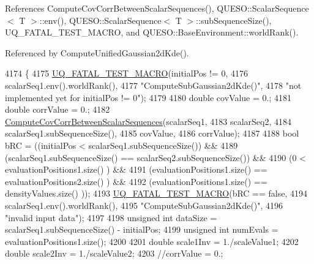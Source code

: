 References Compute\-Cov\-Corr\-Between\-Scalar\-Sequences(), Q\-U\-E\-S\-O\-::\-Scalar\-Sequence$<$ T $>$\-::env(), Q\-U\-E\-S\-O\-::\-Scalar\-Sequence$<$ T $>$\-::sub\-Sequence\-Size(), U\-Q\-\_\-\-F\-A\-T\-A\-L\-\_\-\-T\-E\-S\-T\-\_\-\-M\-A\-C\-R\-O, and Q\-U\-E\-S\-O\-::\-Base\-Environment\-::world\-Rank().



Referenced by Compute\-Unified\-Gaussian2d\-Kde().


\begin{DoxyCode}
4174 \{
4175   \hyperlink{_defines_8h_a56d63d18d0a6d45757de47fcc06f574d}{UQ\_FATAL\_TEST\_MACRO}(initialPos != 0,
4176                       scalarSeq1.env().worldRank(),
4177                       \textcolor{stringliteral}{"ComputeSubGaussian2dKde()"},
4178                       \textcolor{stringliteral}{"not implemented yet for initialPos != 0"});
4179 
4180   \textcolor{keywordtype}{double} covValue  = 0.;
4181   \textcolor{keywordtype}{double} corrValue = 0.;
4182   \hyperlink{namespace_q_u_e_s_o_add6823a7271447445f532bf5ce73e9b8}{ComputeCovCorrBetweenScalarSequences}(scalarSeq1,
4183                                          scalarSeq2,
4184                                          scalarSeq1.subSequenceSize(),
4185                                          covValue,
4186                                          corrValue);
4187 
4188   \textcolor{keywordtype}{bool} bRC = ((initialPos                   <  scalarSeq1.subSequenceSize()) &&
4189               (scalarSeq1.subSequenceSize() == scalarSeq2.subSequenceSize()) &&
4190               (0                            <  evaluationPositions1.size() ) &&
4191               (evaluationPositions1.size()  == evaluationPositions2.size() ) &&
4192               (evaluationPositions1.size()  == densityValues.size()        ));
4193   \hyperlink{_defines_8h_a56d63d18d0a6d45757de47fcc06f574d}{UQ\_FATAL\_TEST\_MACRO}(bRC == \textcolor{keyword}{false},
4194                       scalarSeq1.env().worldRank(),
4195                       \textcolor{stringliteral}{"ComputeSubGaussian2dKde()"},
4196                       \textcolor{stringliteral}{"invalid input data"});
4197 
4198   \textcolor{keywordtype}{unsigned} \textcolor{keywordtype}{int} dataSize = scalarSeq1.subSequenceSize() - initialPos;
4199   \textcolor{keywordtype}{unsigned} \textcolor{keywordtype}{int} numEvals = evaluationPositions1.size();
4200 
4201   \textcolor{keywordtype}{double} scale1Inv = 1./scaleValue1;
4202   \textcolor{keywordtype}{double} scale2Inv = 1./scaleValue2;
4203   \textcolor{comment}{//corrValue = 0.;}

\end{DoxyCode}
